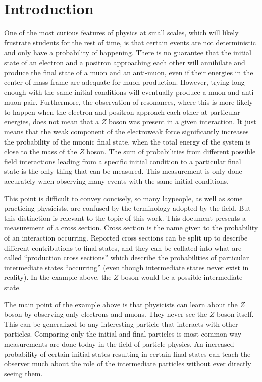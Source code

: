 \chapter{Introduction} \label{ch:intro}

One of the most curious features of physics at small scales,
which will likely frustrate students for the rest of time,
is that certain events are not deterministic and only have a probability of happening.
There is no guarantee that the initial state of an electron and a positron approaching
each other will annihilate and produce the final state of a muon and an anti-muon,
even if their energies in the center-of-mass frame are adequate for muon production.
However, trying long enough with the same initial conditions will eventually
produce a muon and anti-muon pair.
Furthermore, the observation of resonances, where this is more likely to happen
when the electron and positron approach each other at particular energies,
does not mean that a $Z$ boson was present in a given interaction.
It just means that the weak component of the electroweak force significantly increases
the probability of the muonic final state,
when the total energy of the system is close to the mass of the $Z$ boson.
The sum of probabilities from different possible field interactions leading from a specific
initial condition to a particular final state is the only thing that can be measured.
This measurement is only done accurately
when observing many events with the same initial conditions.

This point is difficult to convey concisely, so many laypeople,
as well as some practicing physicists, are confused by the terminology adopted by the field.
But this distinction is relevant to the topic of this work.
This document presents a measurement of a cross section.
Cross section is the name given to the probability of an interaction occurring.
Reported cross sections can be split up to describe different contributions to final states,
and they can be collated into what are called ``production cross sections'' which describe
the probabilities of particular intermediate states ``occurring''
(even though intermediate states never exist in reality).
In the example above, the $Z$ boson would be a possible intermediate state.

The main point of the example above is that physicists can learn about the $Z$ boson
by observing only electrons and muons.
They never see the $Z$ boson itself.
This can be generalized to any interesting particle that interacts with other particles.
Comparing only the initial and final particles is most common way measurements are done today
in the field of particle physics.
An increased probability of certain initial states resulting in certain final states
can teach the observer much about the role of the intermediate particles
without ever directly seeing them.

